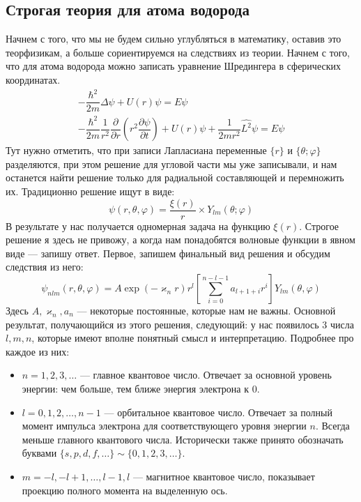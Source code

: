 \documentclass[12pt]{article}
\begin{document}
\subsection{Строгая теория для атома водорода}
Начнем с того, что мы не будем сильно углубляться в математику, оставив это теорфизикам, а больше сориентируемся на следствиях из теории. Начнем с того, что для атома водорода можно записать уравнение Шредингера в сферических координатах. 
\begin{gather}
\label{eq:sem_06_schrodinger_atom}
    -\dfrac{\hbar^2}{2m}\Delta\psi + U(r)\psi = E\psi\\
    -\dfrac{\hbar^2}{2m}\dfrac{1}{r^2}\dfrac{\partial}{\partial r}\left( r^2 \dfrac{\partial\psi}{\partial t}\right) + U(r)\psi +\dfrac{1}{2mr^2}\hat{L^2}\psi = E\psi
\end{gather}
Тут нужно отметить, что при записи Лапласиана переменные $\{r\}$ и $\{\theta; \varphi\}$ разделяются, при этом решение для угловой части мы уже записывали, и нам останется найти решение только для радиальной составляющей и перемножить их. Традиционно решение ищут в виде:
\begin{equation*}
    \psi(r, \theta, \varphi) = \dfrac{\xi(r)}{r}\times Y_{lm}(\theta; \varphi)
\end{equation*}
В результате у нас получается одномерная задача на функцию $\xi(r)$. Строгое решение я здесь не привожу, а когда нам понадобятся волновые функции в явном виде --- запишу ответ.
Первое, запишем финальный вид решения и обсудим следствия из него:
\begin{equation*}
    \psi_{nlm}(r, \theta, \varphi) = A \exp{(-\varkappa_n r)}r^l\left[\sum\limits_{i=0}^{n-l-1}a_{l+1+i}r^i\right]Y_{lm}(\theta, \varphi)
\end{equation*}
Здесь $A, \varkappa_n, a_n$ --- некоторые постоянные, которые нам не важны. Основной результат, получающийся из этого решения, следующий: у нас появилось 3 числа $l,m,n$, которые имеют вполне понятный смысл и интерпретацию. Подробнее про каждое из них:
\begin{itemize}
    \item $n = 1, 2, 3, \dots $ --- главное квантовое число. Отвечает за основной уровень энергии: чем больше, тем ближе энергия электрона к 0.
    \item $l = 0, 1, 2, \dots, n-1$ --- орбитальное квантовое число. Отвечает за полный момент импульса электрона для соответствующего уровня энергии $n$. Всегда меньше главного квантового числа. Исторически также принято обозначать буквами $\{s,p,d,f, \dots \} \sim \{0,1,2,3, \dots\}$.
    \item $m = -l, -l+1, \dots, l-1, l$ --- магнитное квантовое число, показывает проекцию полного момента на выделенную ось.
\end{itemize}
\end{document}
